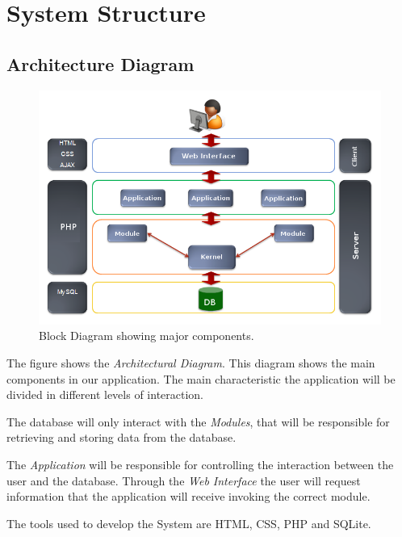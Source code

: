 \documentclass[a4paper,12pt,oneside]{report}
\begin{document}
\section{ System Structure}
\subsection{ Architecture Diagram}
\begin{figure}[h!]
  \begin{center}
   \includegraphics[width=13.7cm]{pics/ar.png}
  \end{center}
\caption{Block Diagram showing major components.}
\end{figure}

The figure shows the \emph{Architectural Diagram}. This diagram shows the main components in our application. The main characteristic the application will be divided in different levels of interaction. 

The database will only interact with the \emph{Modules}, that will be responsible for retrieving and storing data from the database.

 The \emph{Application} will be responsible for controlling the interaction between the user and the database. Through the \emph{Web Interface} the user will request information that the application will receive invoking the correct module.

The tools used to develop the System are HTML, CSS, PHP and SQLite.

\newpage
\end{document}

